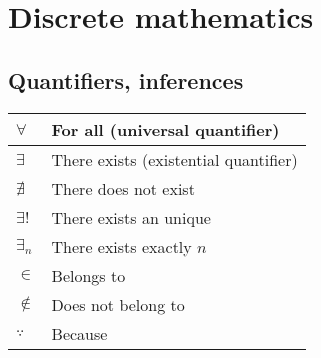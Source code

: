 \section{Discrete mathematics}
\subsection{Quantifiers, inferences}
\begin{xltabular}{\textwidth}{XX}
	\(\forall\)                  & For all (universal quantifier) \cite{grahamConcreteMathematicsFoundation1989}                                                                                                                                \\ \hline
	\(\exists\)                  & There exists (existential quantifier) \cite{grahamConcreteMathematicsFoundation1989}                                                                                                                         \\ \hline
	\(\nexists\)                 & There does not exist \cite{grahamConcreteMathematicsFoundation1989}                                                                                                                                          \\ \hline
	\(\exists!\)                 & There exists an unique \cite{grahamConcreteMathematicsFoundation1989}                                                                                                                                        \\ \hline
	\(\exists_{n}\)              & There exists exactly \(n\) \cite{rosenDiscreteMathematicsIts2011}                                                                                                                                            \\ \hline
	\(\in\)                      & Belongs to \cite{grahamConcreteMathematicsFoundation1989}                                                                                                                                                    \\ \hline
	\(\not\in\)                  & Does not belong to \cite{grahamConcreteMathematicsFoundation1989}                                                                                                                                            \\ \hline
	\(\because\)                 & Because \cite{grahamConcreteMathematicsFoundation1989}                                                                                                                                                       \\ \hline

\end{xltabular}
